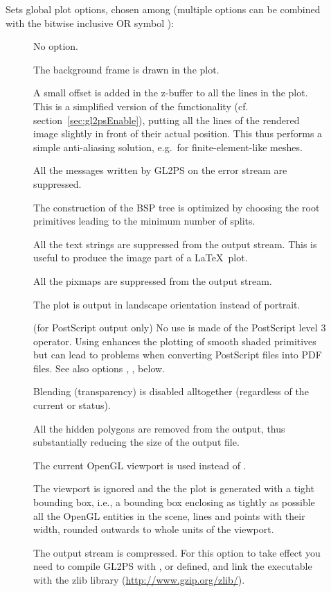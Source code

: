 \begin{description}
\item[] Sets global plot options, chosen among (multiple options
  can be combined with the bitwise inclusive OR symbol \dd{|}):

\begin{description}
\item[] No option.
\item[] The background frame is drawn in the
  plot.
\item[] A small offset is added in the z-buffer
  to all the lines in the plot. This is a simplified version of the
   functionality
  (cf. section~\ref{sec:gl2psEnable}), putting all the lines of the rendered
  image slightly in front of their actual position. This thus performs a
  simple anti-aliasing solution, e.g.\ for finite-element-like meshes.
\item[] All the messages written by GL2PS on the error
  stream are suppressed.
\item[] The construction of the BSP tree is optimized by
  choosing the root primitives leading to the minimum number of splits.
\item[] All the text strings are suppressed from
  the output stream. This is useful to produce the image part of a \LaTeX\ plot.
\item[] All the pixmaps are suppressed from the output
  stream.
\item[] The plot is output in landscape orientation
  instead of portrait.
\item[] (for PostScript output only) No use is made
  of the  PostScript level 3 operator. Using  enhances
  the plotting of smooth shaded primitives but can lead to problems when
  converting PostScript files into PDF files. See also options ,
  ,  below.
\item[] Blending (transparency) is disabled
  alltogether (regardless of the current  or 
  status).
\item[] All the hidden polygons are removed from
  the output, thus substantially reducing the size of the output file.
\item[] The current OpenGL viewport is used
  instead of .
\item[] The viewport is ignored and the
  the plot is generated with a tight bounding box, i.e., a bounding
  box enclosing as tightly as possible all the OpenGL entities in the
  scene, lines and points with their width, rounded outwards to whole units
  of the viewport.
\item[] The output stream is compressed. For this option
  to take effect you need to compile GL2PS with ,
   or  defined, and link the executable
  with the zlib library (\url{http://www.gzip.org/zlib/}).


\end{description}
\end{description}
